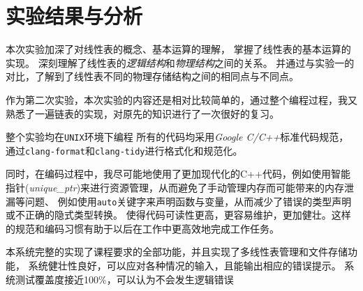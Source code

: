 \section{实验结果与分析}\label{sec:test24}
本次实验加深了对线性表的概念、基本运算的理解，
掌握了线性表的基本运算的实现。
深刻理解了线性表的\emph{逻辑结构}和\emph{物理结构}之间的关系。
并通过与实验一的对比，了解到了线性表不同的物理存储结构之间的相同点与不同点。
\par
作为第二次实验，本次实验的内容还是相对比较简单的，通过整个编程过程，我又熟悉了一遍链表的实现，对原先的知识进行了一次很好的复习。
\par 整个实验均在\texttt{UNIX}环境下编程
所有的代码均采用\emph{Google C/C++}标准代码规范，
通过\texttt{clang-format}和\texttt{clang-tidy}进行格式化和规范化。
\par
同时，在编码过程中，我尽可能地使用了更加现代化的C++代码，例如使用智能指针(\textit{unique\_ptr})来进行资源管理，从而避免了手动管理内存而可能带来的内存泄漏等问题、
例如使用\texttt{auto}关键字来声明函数与变量，从而减少了错误的类型声明或不正确的隐式类型转换。
使得代码可读性更高，更容易维护，更加健壮。这样的规范和编码习惯有助于以后在工作中更高效地完成工作任务。
\par
本系统完整的实现了课程要求的全部功能，并且实现了多线性表管理和文件存储功能，
系统健壮性良好，可以应对各种情况的输入，且能输出相应的错误提示。
系统测试覆盖度接近100\%，可以认为不会发生逻辑错误
\par

